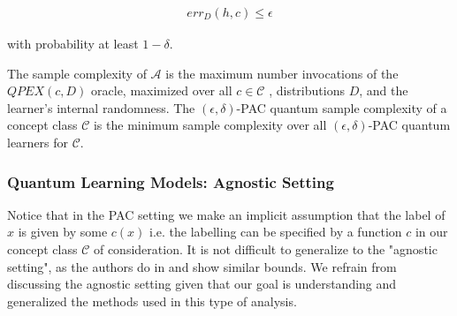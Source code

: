 \documentclass[main.tex]{subfiles}
\begin{document}
\begin{align}
err_D (h, c) \leq \epsilon	
\end{align}

with probability at least $1 - \delta$.

The sample complexity of $\mathcal{A}$ is the maximum number invocations of the $QPEX(c,D)$ oracle, maximized over all $c \in \mathcal{C}$ , distributions $D$, and the learner’s internal randomness. The $(\epsilon, \delta)$-PAC quantum sample complexity of a concept class $\mathcal{C}$ is the minimum sample complexity over all $(\epsilon,\delta)$-PAC quantum learners for $\mathcal{C}$.


\subsubsection{Quantum Learning Models: Agnostic Setting}

Notice that in the PAC setting we make an implicit assumption that the label of $x$ is given by some $c(x)$ i.e. the labelling can be specified by a function $c$ in our concept class $\mathcal{C}$ of consideration. It is not difficult to generalize to the "agnostic setting", as the authors do in \cite{arunachalam2016optimal} and show similar bounds. We refrain from discussing the agnostic setting given that our goal is understanding and generalized the methods used in this type of analysis.
%
%
%
%
%
%
%
\end{document}
